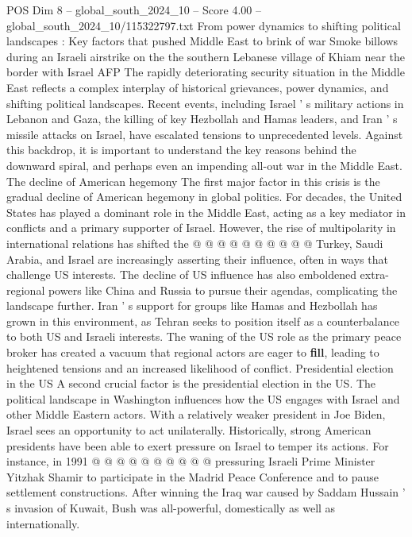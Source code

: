 \begin{textsample}{POS Dim 8 – global\_south\_2024\_10 – Score 4.00 – global\_south\_2024\_10/115322797.txt}  \label{ex:f8_pos_302}
From power dynamics to shifting political landscapes : Key factors that pushed Middle East to brink of war Smoke billows during an Israeli airstrike on the the southern Lebanese village of Khiam near the border with Israel AFP The rapidly deteriorating security situation in the Middle East reflects a complex interplay of historical grievances, power dynamics, and shifting political landscapes.
Recent events, including Israel ' s military actions in Lebanon and Gaza, the killing of key Hezbollah and Hamas leaders, and Iran ' s missile attacks on Israel, have escalated tensions to unprecedented levels.
Against this backdrop, it is important to understand the key reasons behind the downward spiral, and perhaps even an impending all-out war in the Middle East.
The decline of American hegemony The first major factor in this crisis is the gradual decline of American hegemony in global politics.
For decades, the United States has played a dominant role in the Middle East, acting as a key mediator in conflicts and a primary supporter of Israel.
However, the rise of multipolarity in international relations has shifted the @ @ @ @ @ @ @ @ @ @ Turkey, Saudi Arabia, and Israel are increasingly asserting their influence, often in ways that challenge US interests.
The decline of US influence has also emboldened extra-regional powers like China and Russia to pursue their agendas, complicating the landscape further.
Iran ' s support for groups like Hamas and Hezbollah has grown in this environment, as Tehran seeks to position itself as a counterbalance to both US and Israeli interests.
The waning of the US role as the primary peace broker has created a vacuum that regional actors are eager to \textbf{fill}, leading to heightened tensions and an increased likelihood of conflict.
Presidential election in the US A second crucial factor is the presidential election in the US.
The political landscape in Washington influences how the US engages with Israel and other Middle Eastern actors.
With a relatively weaker president in Joe Biden, Israel sees an opportunity to act unilaterally.
Historically, strong American presidents have been able to exert pressure on Israel to temper its actions.
For instance, in 1991 @ @ @ @ @ @ @ @ @ @ pressuring Israeli Prime Minister Yitzhak Shamir to participate in the Madrid Peace Conference and to pause settlement constructions.
After winning the Iraq war caused by Saddam Hussain ' s invasion of Kuwait, Bush was all-powerful, domestically as well as internationally.

\end{textsample}
